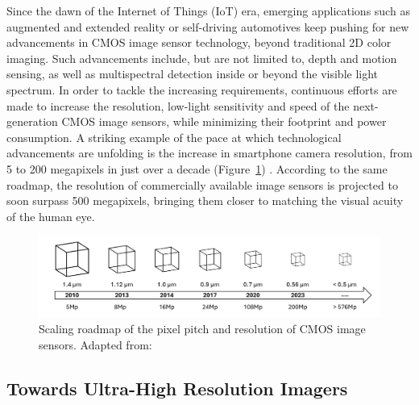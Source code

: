 Since the dawn of the Internet of Things (IoT) era, emerging applications such as augmented and extended reality or self-driving automotives keep pushing for new advancements in CMOS image sensor technology, beyond traditional 2D color imaging. Such advancements include, but are not limited to, depth and motion sensing, as well as multispectral detection inside or beyond the visible light spectrum. In order to tackle the increasing requirements, continuous efforts are made to increase the resolution, low-light sensitivity and speed of the next-generation CMOS image sensors, while minimizing their footprint and power consumption. A striking example of the pace at which technological advancements are unfolding is the increase in smartphone camera resolution, from 5 to 200 megapixels in just over a decade (Figure~\ref{fig:ch1:pixel_size}) \cite{SookyoungRoh2025Dispersion-engineeredSensors}. According to the same roadmap, the resolution of commercially available image sensors is projected to soon surpass 500 megapixels, bringing them closer to matching the visual acuity of the human eye.


\begin{figure} [htbp]
  \centering
  \medskip
  \includegraphics[width=.99\textwidth]{chapters/introduction/image/pixel_miniaturization.pdf}
  \caption [Pixel miniaturization roadmap.]{Scaling roadmap of the pixel pitch and resolution of CMOS image sensors. Adapted from: \cite{SookyoungRoh2025Dispersion-engineeredSensors}}
  \label{fig:ch1:pixel_size}
\end{figure}

\subsection{Towards Ultra-High Resolution Imagers}

